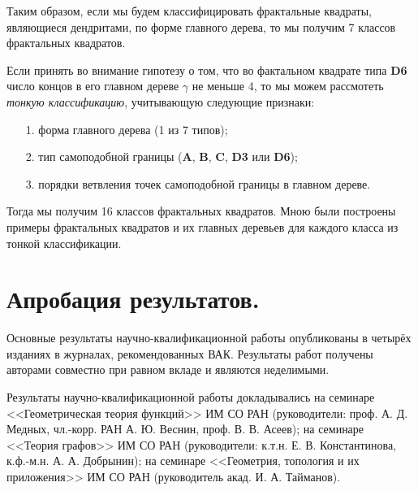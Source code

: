 Таким образом, если мы будем классифицировать фрактальные квадраты, являющиеся дендритами, по форме главного дерева, то мы получим 7 классов фрактальных квадратов.

Если принять во внимание гипотезу о том, что во фактальном квадрате типа {\bf D6} число концов в его главном дереве $\gamma$ не меньше 4, то мы можем рассмотеть {\em тонкую классификацию}, учитывающую следующие признаки:
\begin{itemize}[nolistsep]
	\item[1.] форма главного дерева (1 из 7 типов);
	\item[2.] тип самоподобной границы ({\bf A}, {\bf B}, {\bf C}, {\bf D3} или {\bf D6});
	\item[3.] порядки ветвления точек самоподобной границы в главном дереве.
\end{itemize}
Тогда мы получим 16 классов фрактальных квадратов. 
Мною были построены примеры фрактальных квадратов и их главных деревьев для каждого класса из тонкой классификации.



\section{Апробация результатов.}

Основные результаты научно-квалификационной работы опубликованы в четырёх изданиях \cite{DST2021, DST2022, TD2022fs, TD2023fs} в журналах, рекомендованных ВАК.
Результаты работ \cite{DST2021, DST2022, TD2022fs, TD2023fs} получены авторами совместно при равном вкладе и являются неделимыми.

Результаты научно-квалификационной работы докладывались на семинаре <<Геометрическая теория функций>> ИМ СО РАН (руководители:
проф. А. Д. Медных, чл.-корр. РАН А. Ю. Веснин, проф. В. В. Асеев); на семинаре <<Теория графов>> ИМ СО РАН (руководители: к.т.н. Е. В. Константинова, к.ф.-м.н. А. А. Добрынин); на семинаре <<Геометрия, топология и их приложения>> ИМ СО РАН (руководитель акад. И. А. Тайманов).

